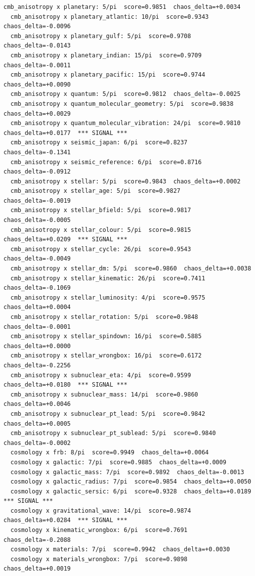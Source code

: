 \documentclass[11pt, letterpaper, openany]{book}
\begin{document}
\begin{empiricalbox}
\begin{lstlisting}[style=terminal]
  cmb_anisotropy x planetary: 5/pi  score=0.9851  chaos_delta=+0.0034
  cmb_anisotropy x planetary_atlantic: 10/pi  score=0.9343  chaos_delta=-0.0096
  cmb_anisotropy x planetary_gulf: 5/pi  score=0.9708  chaos_delta=-0.0143
  cmb_anisotropy x planetary_indian: 15/pi  score=0.9709  chaos_delta=-0.0011
  cmb_anisotropy x planetary_pacific: 15/pi  score=0.9744  chaos_delta=+0.0090
  cmb_anisotropy x quantum: 5/pi  score=0.9812  chaos_delta=-0.0025
  cmb_anisotropy x quantum_molecular_geometry: 5/pi  score=0.9838  chaos_delta=+0.0029
  cmb_anisotropy x quantum_molecular_vibration: 24/pi  score=0.9810  chaos_delta=+0.0177  *** SIGNAL ***
  cmb_anisotropy x seismic_japan: 6/pi  score=0.8237  chaos_delta=-0.1341
  cmb_anisotropy x seismic_reference: 6/pi  score=0.8716  chaos_delta=-0.0912
  cmb_anisotropy x stellar: 5/pi  score=0.9843  chaos_delta=+0.0002
  cmb_anisotropy x stellar_age: 5/pi  score=0.9827  chaos_delta=-0.0019
  cmb_anisotropy x stellar_bfield: 5/pi  score=0.9817  chaos_delta=-0.0005
  cmb_anisotropy x stellar_colour: 5/pi  score=0.9815  chaos_delta=+0.0209  *** SIGNAL ***
  cmb_anisotropy x stellar_cycle: 26/pi  score=0.9543  chaos_delta=-0.0049
  cmb_anisotropy x stellar_dm: 5/pi  score=0.9860  chaos_delta=+0.0038
  cmb_anisotropy x stellar_kinematic: 26/pi  score=0.7411  chaos_delta=-0.1069
  cmb_anisotropy x stellar_luminosity: 4/pi  score=0.9575  chaos_delta=+0.0004
  cmb_anisotropy x stellar_rotation: 5/pi  score=0.9848  chaos_delta=-0.0001
  cmb_anisotropy x stellar_spindown: 16/pi  score=0.5885  chaos_delta=+0.0000
  cmb_anisotropy x stellar_wrongbox: 16/pi  score=0.6172  chaos_delta=-0.2256
  cmb_anisotropy x subnuclear_eta: 4/pi  score=0.9599  chaos_delta=+0.0180  *** SIGNAL ***
  cmb_anisotropy x subnuclear_mass: 14/pi  score=0.9860  chaos_delta=+0.0046
  cmb_anisotropy x subnuclear_pt_lead: 5/pi  score=0.9842  chaos_delta=+0.0005
  cmb_anisotropy x subnuclear_pt_sublead: 5/pi  score=0.9840  chaos_delta=-0.0002
  cosmology x frb: 8/pi  score=0.9949  chaos_delta=+0.0064
  cosmology x galactic: 7/pi  score=0.9885  chaos_delta=+0.0009
  cosmology x galactic_mass: 7/pi  score=0.9892  chaos_delta=-0.0013
  cosmology x galactic_radius: 7/pi  score=0.9854  chaos_delta=+0.0050
  cosmology x galactic_sersic: 6/pi  score=0.9328  chaos_delta=+0.0189  *** SIGNAL ***
  cosmology x gravitational_wave: 14/pi  score=0.9874  chaos_delta=+0.0284  *** SIGNAL ***
  cosmology x kinematic_wrongbox: 6/pi  score=0.7691  chaos_delta=-0.2088
  cosmology x materials: 7/pi  score=0.9942  chaos_delta=+0.0030
  cosmology x materials_wrongbox: 7/pi  score=0.9898  chaos_delta=+0.0019

\end{lstlisting}
\end{empiricalbox}
\end{document}
